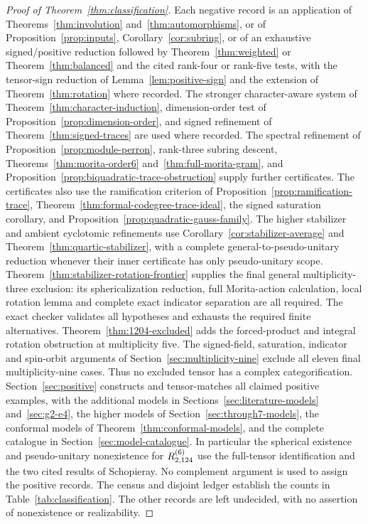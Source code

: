 \begin{proof}[Proof of Theorem~\ref{thm:classification}]
Each negative record is an application of Theorems~\ref{thm:involution}
and~\ref{thm:automorphisms}, or of Proposition~\ref{prop:inputs},
Corollary~\ref{cor:subring}, or of an exhaustive signed/positive reduction
followed by Theorem~\ref{thm:weighted} or Theorem~\ref{thm:balanced}
and the cited rank-four or rank-five tests, with the tensor-sign
reduction of Lemma~\ref{lem:positive-sign} and the extension of
Theorem~\ref{thm:rotation} where recorded. The stronger character-aware system of Theorem~\ref{thm:character-induction}, dimension-order test of Proposition~\ref{prop:dimension-order}, and signed refinement of Theorem~\ref{thm:signed-traces} are used where recorded. The spectral refinement of Proposition~\ref{prop:module-perron},
rank-three subring descent, Theorems~\ref{thm:morita-order6}
and~\ref{thm:full-morita-gram}, and
Proposition~\ref{prop:biquadratic-trace-obstruction} supply further certificates. The certificates also
use the ramification criterion of Proposition~\ref{prop:ramification-trace},
Theorem~\ref{thm:formal-codegree-trace-ideal}, the signed saturation
corollary, and Proposition~\ref{prop:quadratic-gauss-family}. The higher
stabilizer and ambient cyclotomic refinements use
Corollary~\ref{cor:stabilizer-average} and
Theorem~\ref{thm:quartic-stabilizer}, with a complete general-to-pseudo-unitary
reduction whenever their inner certificate has only pseudo-unitary scope.
Theorem~\ref{thm:stabilizer-rotation-frontier} supplies the final general
multiplicity-three exclusion: its sphericalization reduction, full
Morita-action calculation, local rotation lemma and complete exact
indicator separation are all required. The exact checker validates
all hypotheses and exhausts the required finite alternatives.
Theorem~\ref{thm:1204-excluded} adds the forced-product and integral
rotation obstruction at multiplicity five. The signed-field, saturation,
indicator and spin-orbit arguments of Section~\ref{sec:multiplicity-nine}
exclude all eleven final multiplicity-nine cases. Thus no
excluded tensor has a complex categorification. Section~\ref{sec:positive}
constructs and tensor-matches all claimed positive examples, with the
additional models in Sections~\ref{sec:literature-models} and~\ref{sec:g2-e4}, the higher models of Section~\ref{sec:through7-models}, the conformal
models of Theorem~\ref{thm:conformal-models}, and the complete
catalogue in Section~\ref{sec:model-catalogue}. In particular the spherical
existence and pseudo-unitary nonexistence for $R^{(6)}_{2,124}$ use the
full-tensor identification and the two cited results of Schopieray. No complement argument is used
to assign the positive records. The census and disjoint ledger establish the counts in
Table~\ref{tab:classification}. The other records are left undecided,
with no assertion of nonexistence or realizability.
\end{proof}

